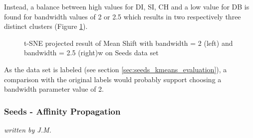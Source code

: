 Instead, a balance between high values for DI, SI, CH and a low value for DB is found for bandwidth values of 2 or 2.5 which results in two respectively three distinct clusters (Figure \ref{fig:meanshift_seeds_2_tsne}). 
\begin{figure}[H]
    \caption{t-SNE projected result of Mean Shift with bandwidth = 2 (left) and bandwidth = 2.5 (right)w on Seeds data set}
    \label{fig:meanshift_seeds_2_tsne}
\end{figure}

As the data set is labeled (see section \ref{sec:seeds_kmeans_evaluation}), a comparison with the original labels would probably support choosing a bandwidth parameter value of 2.

\subsubsection{Seeds - Affinity Propagation}
\textit{written by J.M.}\\


